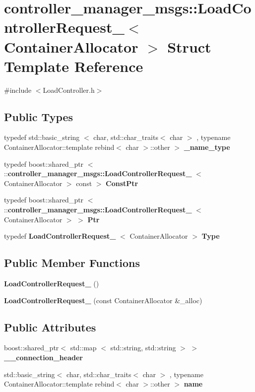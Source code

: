 \section{controller\-\_\-manager\-\_\-msgs\-:\-:\-Load\-Controller\-Request\-\_\-$<$ \-Container\-Allocator $>$ \-Struct \-Template \-Reference}
\label{structcontroller__manager__msgs_1_1LoadControllerRequest__}


{\ttfamily \#include $<$\-Load\-Controller.\-h$>$}

\subsection*{\-Public \-Types}
\begin{DoxyCompactItemize}
\item 
typedef std\-::basic\-\_\-string\*
$<$ char, std\-::char\-\_\-traits$<$ char $>$\*
, typename \*
\-Container\-Allocator\-::template \*
rebind$<$ char $>$\-::other $>$ {\bf \-\_\-name\-\_\-type}
\item 
typedef boost\-::shared\-\_\-ptr\*
$<$ \-::{\bf controller\-\_\-manager\-\_\-msgs\-::\-Load\-Controller\-Request\-\_\-}\*
$<$ \-Container\-Allocator $>$ const  $>$ {\bf \-Const\-Ptr}
\item 
typedef boost\-::shared\-\_\-ptr\*
$<$ \-::{\bf controller\-\_\-manager\-\_\-msgs\-::\-Load\-Controller\-Request\-\_\-}\*
$<$ \-Container\-Allocator $>$ $>$ {\bf \-Ptr}
\item 
typedef {\bf \-Load\-Controller\-Request\-\_\-}\*
$<$ \-Container\-Allocator $>$ {\bf \-Type}
\end{DoxyCompactItemize}
\subsection*{\-Public \-Member \-Functions}
\begin{DoxyCompactItemize}
\item 
{\bf \-Load\-Controller\-Request\-\_\-} ()
\item 
{\bf \-Load\-Controller\-Request\-\_\-} (const \-Container\-Allocator \&\-\_\-alloc)
\end{DoxyCompactItemize}
\subsection*{\-Public \-Attributes}
\begin{DoxyCompactItemize}
\item 
boost\-::shared\-\_\-ptr$<$ std\-::map\*
$<$ std\-::string, std\-::string $>$ $>$ {\bf \-\_\-\-\_\-connection\-\_\-header}
\item 
std\-::basic\-\_\-string$<$ char, \*
std\-::char\-\_\-traits$<$ char $>$\*
, typename \*
\-Container\-Allocator\-::template \*
rebind$<$ char $>$\-::other $>$ {\bf name}
\end{DoxyCompactItemize}


